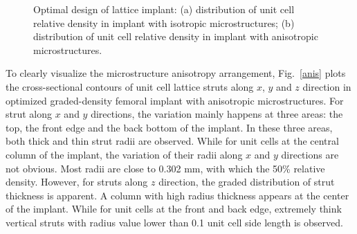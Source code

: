 \documentclass[12pt]{extbook}
\begin{document}
\begin{figure}[htbp]
\centering
{}
\caption{Optimal design of lattice implant: (a) distribution of unit cell relative density in implant with isotropic microstructures; (b) distribution of unit cell relative density in implant with anisotropic microstructures.}
\label{density}
\end{figure}

To clearly visualize the microstructure anisotropy arrangement, Fig.~\ref{anis} plots the cross-sectional contours of unit cell lattice struts along $x$, $y$ and $z$ direction in optimized graded-density femoral implant with anisotropic microstructures. For strut along $x$ and $y$ directions, the variation mainly happens at three areas: the top, the front edge and the back bottom of the implant. In these three areas, both thick and thin strut radii are observed. While for unit cells at the central column of the implant, the variation of their radii along $x$ and $y$ directions are not obvious. Most radii are close to 0.302 mm, with which the 50\% relative density. However, for struts along $z$ direction, the graded distribution of strut thickness is apparent. A column with high radius thickness appears at the center of the implant. While for unit cells at the front and back edge, extremely think vertical struts with radius value lower than 0.1 unit cell side length is observed.\\
\end{document}
